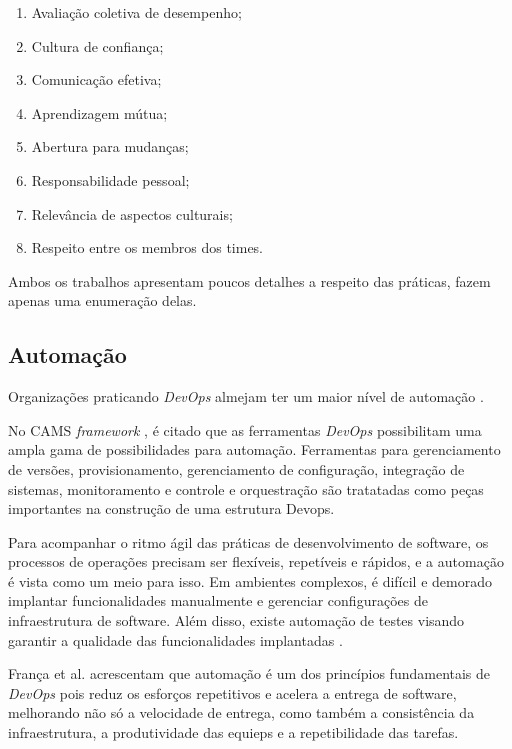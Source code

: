 \begin{enumerate}
\item Avaliação coletiva de desempenho;
\item Cultura de confiança;
\item Comunicação efetiva;
\item Aprendizagem mútua;
\item Abertura para mudanças;
\item Responsabilidade pessoal;
\item Relevância de aspectos culturais;
\item Respeito entre os membros dos times.
\end{enumerate}

Ambos os trabalhos apresentam poucos detalhes a respeito das práticas, fazem
apenas uma enumeração delas.

\subsection{Automação}

Organizações praticando \textit{DevOps} almejam ter um maior nível de automação
\cite{qualitative_devops_journalsw_17}.

No \acrshort{CAMS} \textit{framework} \cite{what_devops_means_2010}, é citado
que as ferramentas \textit{DevOps} possibilitam uma ampla gama de possibilidades
para automação. Ferramentas para gerenciamento de versões, provisionamento,
gerenciamento de configuração, integração de sistemas, monitoramento e controle
e orquestração são tratatadas como peças importantes na construção de uma
estrutura Devops.

Para acompanhar o ritmo ágil das práticas de desenvolvimento de software, os
processos de operações precisam ser flexíveis, repetíveis e rápidos, e a
automação é vista como um meio para isso. Em ambientes complexos, é difícil
e demorado implantar funcionalidades manualmente e gerenciar configurações de
infraestrutura de software. Além disso, existe automação de testes visando
garantir a qualidade das funcionalidades implantadas
\cite{dimensions_of_devops,extending_dimensions}.

França et al. \cite{characterizing_devops} acrescentam que automação é um dos
princípios fundamentais de \textit{DevOps} pois reduz os esforços repetitivos
e acelera a entrega de software, melhorando não só a velocidade de entrega,
como também a consistência da infraestrutura, a produtividade das equieps e
a repetibilidade das tarefas.

